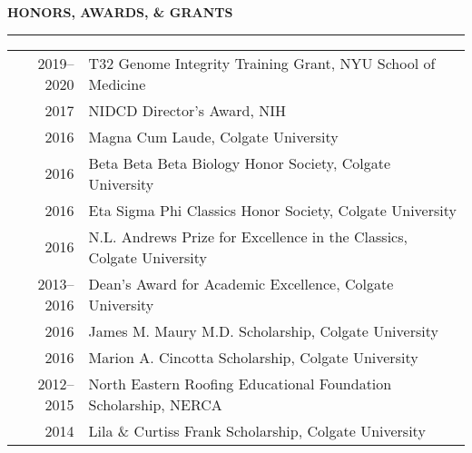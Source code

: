 \documentclass[11pt, letterpaper]{article}
\newenvironment{CVSection}{
\begin{addmargin}[2em]{0em}
\begin{samepage}}
{\end{samepage}
\end{addmargin}\bigskip}
\newcommand{\CVHeading}[1]{
\MakeUppercase{\bf #1}
\smallskip
\hrule
\medskip
}
\begin{document}
\CVHeading{Honors, Awards, \& Grants}
\begin{CVSection}
\begin{tabular}{r|l}
2019--2020 & T32 Genome Integrity Training Grant, NYU School of Medicine\\
2017 & NIDCD Director’s Award, NIH\\
2016 & Magna Cum Laude, Colgate University\\
2016 & Beta Beta Beta Biology Honor Society, Colgate University\\
2016 & Eta Sigma Phi Classics Honor Society, Colgate University\\
2016 & N.L. Andrews Prize for Excellence in the Classics, Colgate University\\
2013--2016 & Dean’s Award for Academic Excellence, Colgate University\\
2016 & James M. Maury M.D. Scholarship, Colgate University\\
2016 & Marion A. Cincotta Scholarship, Colgate University\\
2012--2015 & North Eastern Roofing Educational Foundation Scholarship, NERCA\\
2014 & Lila \& Curtiss Frank Scholarship, Colgate University
\end{tabular}
\end{CVSection}
\end{document}
